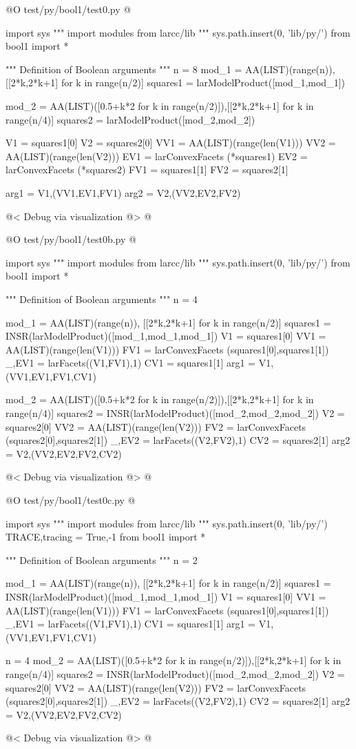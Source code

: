 \documentclass[11pt,oneside]{article}	%
\begin{document}
@O test/py/bool1/test0.py
@{
import sys
""" import modules from larcc/lib """
sys.path.insert(0, 'lib/py/')
from bool1 import *

""" Definition of Boolean arguments """
n = 8
mod_1 = AA(LIST)(range(n)), [[2*k,2*k+1] for k in range(n/2)]
squares1 = larModelProduct([mod_1,mod_1])

mod_2 = AA(LIST)([0.5+k*2 for k in range(n/2)]),[[2*k,2*k+1] for k in range(n/4)]
squares2 = larModelProduct([mod_2,mod_2])

V1 = squares1[0]
V2 = squares2[0]
VV1 = AA(LIST)(range(len(V1)))
VV2 = AA(LIST)(range(len(V2)))
EV1 = larConvexFacets (*squares1)
EV2 = larConvexFacets (*squares2)
FV1 = squares1[1]
FV2 = squares2[1]

arg1 = V1,(VV1,EV1,FV1)
arg2 = V2,(VV2,EV2,FV2)

@< Debug via visualization @>
@}
@O test/py/bool1/test0b.py
@{
import sys
""" import modules from larcc/lib """
sys.path.insert(0, 'lib/py/')
from bool1 import *

""" Definition of Boolean arguments """
n = 4

mod_1 = AA(LIST)(range(n)), [[2*k,2*k+1] for k in range(n/2)]
squares1 = INSR(larModelProduct)([mod_1,mod_1,mod_1])
V1 = squares1[0]
VV1 = AA(LIST)(range(len(V1)))
FV1 = larConvexFacets (squares1[0],squares1[1])
_,EV1 = larFacets((V1,FV1),1)
CV1 = squares1[1]
arg1 = V1,(VV1,EV1,FV1,CV1)

mod_2 = AA(LIST)([0.5+k*2 for k in range(n/2)]),[[2*k,2*k+1] for k in range(n/4)]
squares2 = INSR(larModelProduct)([mod_2,mod_2,mod_2])
V2 = squares2[0]
VV2 = AA(LIST)(range(len(V2)))
FV2 = larConvexFacets (squares2[0],squares2[1])
_,EV2 = larFacets((V2,FV2),1)
CV2 = squares2[1]
arg2 = V2,(VV2,EV2,FV2,CV2)

@< Debug via visualization @>
@}
@O test/py/bool1/test0c.py
@{
import sys
""" import modules from larcc/lib """
sys.path.insert(0, 'lib/py/')
TRACE,tracing = True,-1
from bool1 import *

""" Definition of Boolean arguments """
n = 2

mod_1 = AA(LIST)(range(n)), [[2*k,2*k+1] for k in range(n/2)]
squares1 = INSR(larModelProduct)([mod_1,mod_1,mod_1])
V1 = squares1[0]
VV1 = AA(LIST)(range(len(V1)))
FV1 = larConvexFacets (squares1[0],squares1[1])
_,EV1 = larFacets((V1,FV1),1)
CV1 = squares1[1]
arg1 = V1,(VV1,EV1,FV1,CV1)

n = 4
mod_2 = AA(LIST)([0.5+k*2 for k in range(n/2)]),[[2*k,2*k+1] for k in range(n/4)]
squares2 = INSR(larModelProduct)([mod_2,mod_2,mod_2])
V2 = squares2[0]
VV2 = AA(LIST)(range(len(V2)))
FV2 = larConvexFacets (squares2[0],squares2[1])
_,EV2 = larFacets((V2,FV2),1)
CV2 = squares2[1]
arg2 = V2,(VV2,EV2,FV2,CV2)

@< Debug via visualization @>
@}
\end{document}
